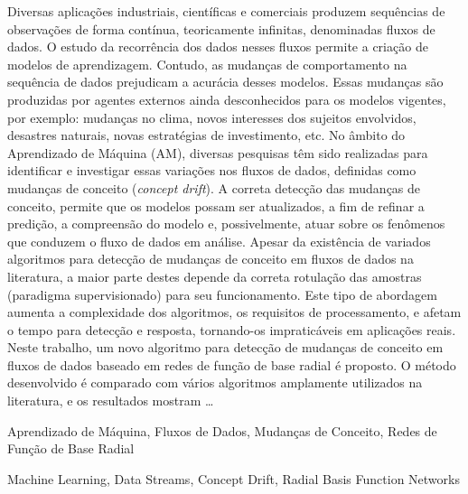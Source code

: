 \documentclass[qual, classic, a4paper]{ufbathesis}
\begin{document}
Diversas aplicações industriais, científicas e comerciais produzem sequências de observações de forma contínua, teoricamente infinitas, denominadas fluxos de dados. 
O estudo da recorrência dos dados nesses fluxos permite a criação de modelos de aprendizagem. Contudo, as mudanças de comportamento na sequência de dados prejudicam a acurácia desses modelos.
Essas mudanças são produzidas por agentes externos ainda desconhecidos para os modelos vigentes, por exemplo: mudanças no clima, novos interesses dos sujeitos envolvidos, desastres naturais, novas estratégias de investimento, etc.
No âmbito do Aprendizado de Máquina (AM), diversas pesquisas têm sido realizadas para identificar e investigar essas variações nos fluxos de dados, definidas como mudanças de conceito (\textit{concept drift}).
A correta detecção das mudanças de conceito, permite que os modelos possam ser atualizados, a fim de refinar a predição, a compreensão do modelo e, possivelmente, atuar sobre os fenômenos que conduzem o fluxo de dados em análise.
Apesar da existência de variados algoritmos para detecção de mudanças de conceito em fluxos de dados na literatura, a maior parte destes depende da correta rotulação das amostras (paradigma supervisionado) para seu funcionamento. Este tipo de abordagem aumenta a complexidade dos algoritmos, os requisitos de processamento, e afetam o tempo para detecção e resposta, tornando-os impraticáveis em aplicações reais.
Neste trabalho, um novo algoritmo para detecção de mudanças de conceito em fluxos de dados baseado em redes de função de base radial é proposto. O método desenvolvido é comparado com vários algoritmos amplamente utilizados na literatura, e os resultados mostram \ldots {}

\begin{keywords}
    Aprendizado de Máquina, Fluxos de Dados, Mudanças de Conceito, Redes de Função de Base Radial
\end{keywords}

\abstract


\begin{keywords}
    Machine Learning, Data Streams, Concept Drift, Radial Basis Function Networks
\end{keywords}

\end{document}
